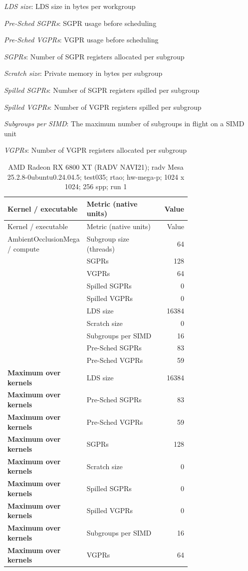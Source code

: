 \noindent\textit{LDS size}: LDS size in bytes per workgroup\par
\noindent\textit{Pre-Sched SGPRs}: SGPR usage before scheduling\par
\noindent\textit{Pre-Sched VGPRs}: VGPR usage before scheduling\par
\noindent\textit{SGPRs}: Number of SGPR registers allocated per subgroup\par
\noindent\textit{Scratch size}: Private memory in bytes per subgroup\par
\noindent\textit{Spilled SGPRs}: Number of SGPR registers spilled per subgroup\par
\noindent\textit{Spilled VGPRs}: Number of VGPR registers spilled per subgroup\par
\noindent\textit{Subgroups per SIMD}: The maximum number of subgroups in flight on a SIMD unit\par
\noindent\textit{VGPRs}: Number of VGPR registers allocated per subgroup\par
\begin{longtable}{p{0.30\linewidth}p{0.43\linewidth}r}
\caption{AMD Radeon RX 6800 XT (RADV NAVI21); radv Mesa 25.2.8-0ubuntu0.24.04.5; test035; rtao; hw-mega-p; 1024 x 1024; 256 spp; run 1}\label{tab:hydra-profile-25}\\
\hline Kernel / executable & Metric (native units) & Value \\\hline
\endfirsthead
\hline Kernel / executable & Metric (native units) & Value \\\hline
\endhead
AmbientOcclusionMega / compute & Subgroup size (threads) & 64 \\
 & SGPRs & 128 \\
 & VGPRs & 64 \\
 & Spilled SGPRs & 0 \\
 & Spilled VGPRs & 0 \\
 & LDS size & 16384 \\
 & Scratch size & 0 \\
 & Subgroups per SIMD & 16 \\
 & Pre-Sched SGPRs & 83 \\
 & Pre-Sched VGPRs & 59 \\
\hline
\textbf{Maximum over kernels} & LDS size & 16384 \\
\textbf{Maximum over kernels} & Pre-Sched SGPRs & 83 \\
\textbf{Maximum over kernels} & Pre-Sched VGPRs & 59 \\
\textbf{Maximum over kernels} & SGPRs & 128 \\
\textbf{Maximum over kernels} & Scratch size & 0 \\
\textbf{Maximum over kernels} & Spilled SGPRs & 0 \\
\textbf{Maximum over kernels} & Spilled VGPRs & 0 \\
\textbf{Maximum over kernels} & Subgroups per SIMD & 16 \\
\textbf{Maximum over kernels} & VGPRs & 64 \\
\hline
\end{longtable}
